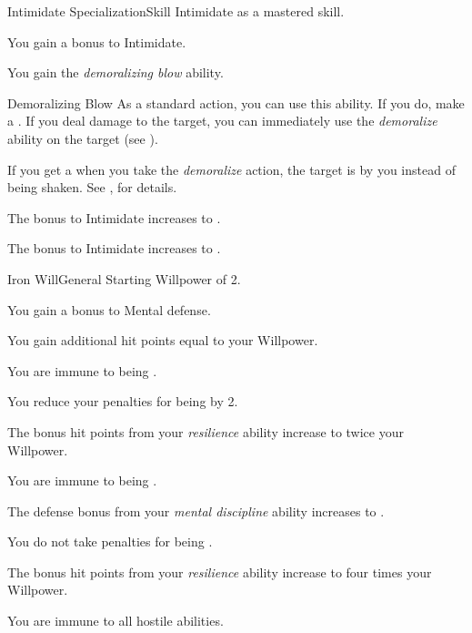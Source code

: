     \begin{feat}{Intimidate Specialization}{Skill}
        \featpre Intimidate as a mastered skill.

         You gain a  bonus to Intimidate.

         You gain the \textit{demoralizing blow} ability.
        \begin{ability}{Demoralizing Blow}
            As a standard action, you can use this ability.
            If you do, make a .
            If you deal damage to the target, you can immediately use the \textit{demoralize} ability on the target (see ).
        \end{ability}

         If you get a  when you take the \textit{demoralize} action, the target is \frightened by you instead of being shaken.
        See , for details.

         The bonus to Intimidate increases to .

         The bonus to Intimidate increases to .
    \end{feat}

    \begin{feat}{Iron Will}{General}
        \featpre Starting Willpower of 2.

         You gain a  bonus to Mental defense.

         You gain additional hit points equal to your Willpower.

         You are immune to being .

         You reduce your penalties for being  by 2.

         The bonus hit points from your \textit{resilience} ability increase to twice your Willpower.

         You are immune to being .

         The defense bonus from your \textit{mental discipline} ability increases to .

         You do not take penalties for being .

         The bonus hit points from your \textit{resilience} ability increase to four times your Willpower.

         You are immune to all hostile  abilities.
    \end{feat}

